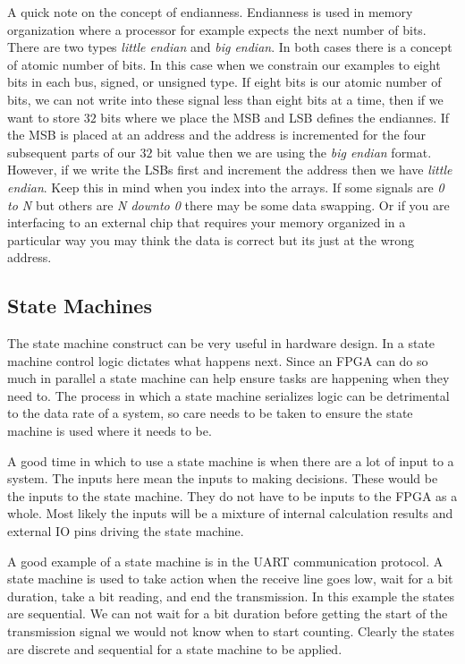 A quick note on the concept of endianness. Endianness is used in memory organization where a processor for example expects the next number of bits. There are two types \emph{little endian} and \emph{big endian}. In both cases there is a concept of atomic number of bits. In this case when we constrain our examples to eight bits in each bus, signed, or unsigned type. If eight bits is our atomic number of bits, we can not write into these signal less than eight bits at a time, then if we want to store $32$ bits where we place the \ac{MSB} and \ac{LSB} defines the endiannes. If the \ac{MSB} is placed at an address and the address is incremented for the four subsequent parts of our $32$ bit value then we are using the \emph{big endian} format. However, if we write the \ac{LSB}s first and increment the address then we have \emph{little endian}. Keep this in mind when you index into the arrays. If some signals are \emph{0 to N} but others are \emph{N downto 0} there may be some data swapping. Or if you are interfacing to an external chip that requires your memory organized in a particular way you may think the data is correct but its just at the wrong address.  
	

\subsection{State Machines}

The state machine construct can be very useful in hardware design. In a state machine control logic dictates what happens next. Since an \ac{FPGA} can do so much in parallel a state machine can help ensure tasks are happening when they need to. The process in which a state machine serializes logic can be detrimental to the data rate of a system, so care needs to be taken to ensure the state machine is used where it needs to be. 

A good time in which to use a state machine is when there are a lot of input to a system. The inputs here mean the inputs to making decisions. These would be the inputs to the state machine. They do not have to be inputs to the \ac{FPGA} as a whole. Most likely the inputs will be a mixture of internal calculation results and external \ac{IO} pins driving the state machine. 

A good example of a state machine is in the \ac{UART} communication protocol. A state machine is used to take action when the receive line goes low, wait for a bit duration, take a bit reading, and end the transmission. In this example the states are sequential. We can not wait for a bit duration before getting the start of the transmission signal we would not know when to start counting. Clearly the states are discrete and sequential for a state machine to be applied. 

